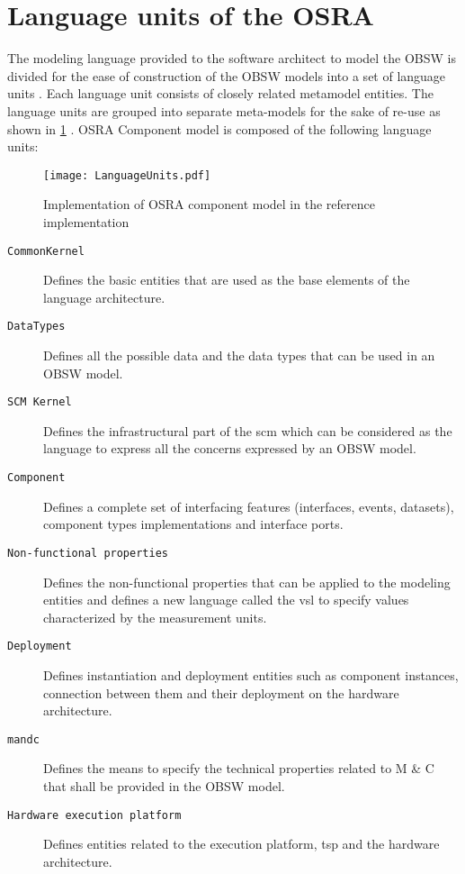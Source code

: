 \section{Language units of the OSRA}
\label{Language units}
The modeling language provided to the software architect to model the OBSW is divided for the ease of construction of the OBSW models into a set of language units \cite{SpecMetamodel}. Each language unit consists of closely related metamodel entities. The language units are grouped into separate meta-models for the sake of re-use as shown in \cref{fig: Language units} \cite{SpecMetamodel}. OSRA Component model is composed of the following language units:

\begin{figure}[h]
	\centering
	\texttt{[image: LanguageUnits.pdf]}
	\caption{Implementation of OSRA component model in the reference implementation}
	\label{fig: Language units}
\end{figure}

\begin{description}
\item [\texttt{CommonKernel}] Defines the basic entities that are used as the base elements of the language architecture.
\item [\texttt{DataTypes}] Defines all the possible data and the data types that can be used in an OBSW model.
\item [\texttt{SCM Kernel}] Defines the infrastructural part of the \ac{scm} which can be considered as the language to express all the concerns expressed by an OBSW model.
\item [\texttt{Component}] Defines a complete set of interfacing features (interfaces, events, datasets), component types implementations and interface ports.
\item [\texttt{Non-functional properties}] Defines the non-functional properties that can be applied to the modeling entities and defines a new language called the \ac{vsl} to specify values characterized by the measurement units.
\item [\texttt{Deployment}] Defines instantiation and deployment entities such as component instances, connection between them and their deployment on the hardware architecture.
\item [\texttt{\ac{mandc}}] Defines the means to specify the technical properties related to M \& C that shall be provided in the OBSW model.
\item [\texttt{Hardware execution platform}] Defines entities related to the execution platform, \ac{tsp} and the hardware architecture.   
\end{description}

